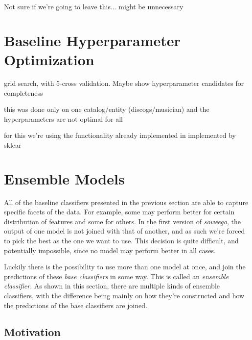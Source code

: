 \documentclass[epsfig,a4paper,11pt,titlepage,twoside,openany]{book}
\begin{document}
Not sure if we're going to leave this... might be unnecessary

\section{Baseline Hyperparameter Optimization}
\label{sec:hyperpar-optimization}

grid search, with 5-cross validation. Maybe show hyperparameter candidates for
completeness

this was done only on one catalog/entity (discogs/musician) and the
hyperparameters are not optimal for all

for this we're using the functionality already implemented in implemented by sklear \cite{scikit-learn}


\section{Ensemble Models}
\label{sec:ensemble-models}

All of the baseline classifiers presented in the previous section are able to capture specific facets of the data. For example, some may perform better for certain distribution of features and some for others. In the first version of \textit{soweego}, the output of one model is not joined with that of another, and as such we're forced to pick the best as the one we want to use. This decision is quite difficult, and potentially impossible, since no model may perform better in all cases. 

Luckily there is the possibility to use more than one model at once, and join the predictions of these \textit{base classifiers} in some way. This is called an \textit{ensemble classifier}. As shown in this section, there are multiple kinds of ensemble classifiers, with the difference being mainly on how they're constructed and how the predictions of the base classifiers are joined.




\subsection{Motivation} 
\label{sec:motivation-ensemble}
\end{document}
